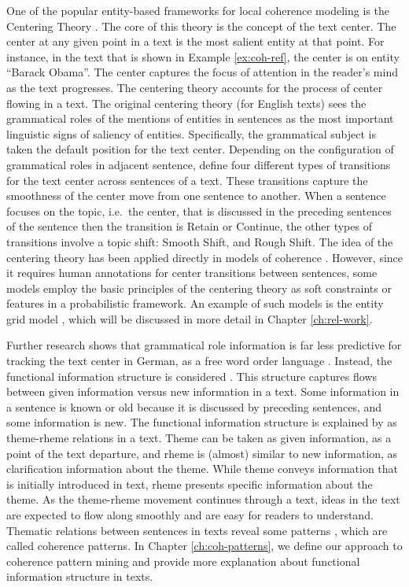 One of the popular entity-based frameworks for local coherence modeling is the Centering Theory \cite{grosz95}. 
The core of this theory is the concept of the text center. 
The center at any given point in a text is the most salient entity at that point. 
For instance, in the text that is shown in Example \ref{ex:coh-ref}, the center is on entity ``Barack Obama''.
The center captures the focus of attention in the reader's mind \cite{grosz95} as the text progresses. 
The centering theory accounts for the process of center flowing in a text. 
The original centering theory (for English texts) sees the grammatical roles of the mentions of entities in sentences as the most important linguistic signs of saliency of entities. 
Specifically, the grammatical subject is taken the default position for the text center. 
Depending on the configuration of grammatical roles in adjacent sentence,  define four different types of transitions for the text center across sentences of a text. 
These transitions capture the smoothness of the center move from one sentence to another. 
When a sentence focuses on the topic, i.e.\ the center, that is discussed in the preceding sentences of the sentence then the transition is Retain or Continue, the other types of transitions involve a topic shift: Smooth Shift, and Rough Shift. 
The idea of the centering theory has been applied directly in models of coherence \cite{karamanis04a}.  
However, since it requires human annotations for center transitions between sentences, some models employ the basic principles of the centering theory as soft constraints or features in a probabilistic framework. 
An example of such models is the entity grid model \cite{barzilay05a,barzilay08}, which will be discussed in more detail in Chapter \ref{ch:rel-work}.

Further research shows that grammatical role information is far less predictive for tracking the text center in German, as a free word order language \cite{strube.acl96}. 
Instead, the functional information structure is considered \cite{danes74}.  
This structure captures flows between given information versus new information in a text. 
Some information in a sentence is known or old because it is discussed by preceding sentences, and some information is new. 
The functional information structure is explained by  as \mbox{theme-rheme} relations in a text. 
Theme can be taken as given information, as a point of the text departure, and rheme is (almost) similar to new information, as clarification information about the theme. 
While theme conveys information that is initially introduced in text, rheme presents specific 
information about the theme. 
As the theme-rheme movement continues through a text, ideas in the text are expected to flow along smoothly and are easy for readers to understand. 
Thematic relations between sentences in texts reveal some patterns \cite{danes74}, which are called  coherence patterns.
In Chapter \ref{ch:coh-patterns}, we define our approach to coherence pattern mining and provide more explanation about functional information structure \cite{danes74} in texts. 

